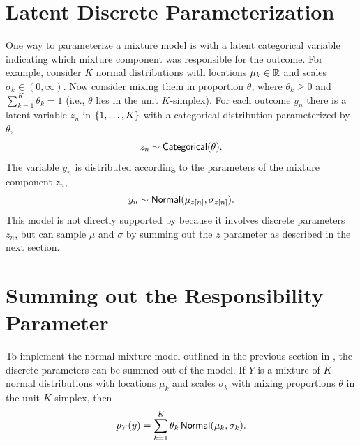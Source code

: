 \section{Latent Discrete Parameterization}

One way to parameterize a mixture model is with a latent categorical
variable indicating which mixture component was responsible for the
outcome. For example, consider $K$ normal distributions with locations
$\mu_k \in \mathbb{R}$ and scales $\sigma_k \in (0,\infty)$.  Now consider
mixing them in proportion $\theta$, where $\theta_k \geq 0$ and
$\sum_{k=1}^K \theta_k = 1$ (i.e., $\theta$ lies in the unit $K$-simplex).
For each outcome $y_n$ there is a latent variable $z_n$ in
$\{ 1,\ldots,K \}$ with a categorical distribution parameterized
by $\theta$,
%
\[
z_n \sim \mbox{\sf Categorical}(\theta).
\]
%
The variable $y_n$ is distributed according to the parameters
of the mixture component $z_n$, 
\[
y_n \sim \mbox{\sf Normal}(\mu_{z[n]},\sigma_{z[n]}).
\]
%
This model is not directly supported by \Stan because it involves
discrete parameters $z_n$, but \Stan can sample $\mu$ and $\sigma$ 
by summing out the $z$ parameter as described in the next section.


\section{Summing out the Responsibility Parameter}

To implement the normal mixture model outlined in the previous
section in \Stan, the discrete parameters can be summed out of the
model. If $Y$ is a mixture of $K$ normal distributions with 
locations $\mu_k$ and scales $\sigma_k$ with mixing proportions
$\theta$ in the unit $K$-simplex, then 
\[
p_Y(y) = \sum_{k=1}^K \theta_k \, \mbox{\sf Normal}(\mu_k,\sigma_k).
\]

